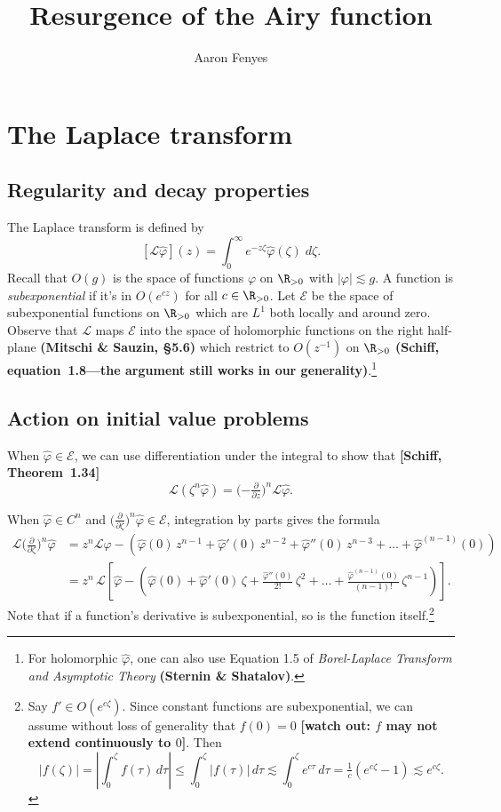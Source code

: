 \documentclass{article}
\title{Resurgence of the Airy function}
\author{Aaron Fenyes}
\theoremstyle{definition}
\theoremstyle{plain}
\newcommand{\posreal}{\R_{> 0}}
\newcommand{\laplace}{\mathcal{L}}
\begin{document}
\maketitle
\section{The Laplace transform}
\subsection{Regularity and decay properties}
The Laplace transform is defined by
\[ [\mathcal{L}\hat{\varphi}](z) = \int_0^\infty e^{-z \zeta} \hat{\varphi}(\zeta)\;d\zeta. \]
Recall that $O(g)$ is the space of functions $\varphi$ on $\posreal$ with $|\varphi| \lesssim g$. A function is {\em subexponential} if it's in $O(e^{cz})$ for all $c \in \posreal$. Let $\mathcal{E}$ be the space of subexponential functions on $\posreal$ which are $L^1$ both locally and around zero. Observe that $\laplace$ maps $\mathcal{E}$ into the space of holomorphic functions on the right half-plane \textbf{(Mitschi \& Sauzin, \S 5.6)} which restrict to $O(z^{-1})$ on $\posreal$ \textbf{(Schiff, equation~1.8---the argument still works in our generality)}.\footnote{For holomorphic $\hat{\varphi}$, one can also use Equation 1.5 of {\em Borel-Laplace Transform and Asymptotic Theory} \textbf{(Sternin \& Shatalov)}.}
\subsection{Action on initial value problems}
When $\hat{\varphi} \in \mathcal{E}$, we can use differentiation under the integral to show that \textbf{[Schiff, Theorem~1.34]}
\[ \laplace (\zeta^n \hat{\varphi}) = \big({-\tfrac{\partial}{\partial z}}\big)^n \laplace \hat{\varphi}. \]

When $\hat{\varphi} \in C^n$ and $\big(\tfrac{\partial}{\partial \zeta}\big)^n \hat{\varphi} \in \mathcal{E}$, integration by parts gives the formula
\begin{align*}
\laplace \big(\tfrac{\partial}{\partial \zeta}\big)^n \hat{\varphi} & = z^n \laplace \hat{\varphi} - \left( \hat{\varphi}(0)\,z^{n-1} + \hat{\varphi}'(0)\,z^{n-2} + \hat{\varphi}''(0)\,z^{n-3} + \ldots + \hat{\varphi}^{(n-1)}(0) \right) \\
& = z^n\,\laplace\left[ \hat{\varphi} - \left( \hat{\varphi}(0) + \hat{\varphi}'(0)\,\zeta + \tfrac{\hat{\varphi}''(0)}{2!}\,\zeta^2 + \ldots + \tfrac{\hat{\varphi}^{(n-1)}(0)}{(n-1)!}\,\zeta^{n-1} \right) \right].
\end{align*}
Note that if a function's derivative is subexponential, so is the function itself.\footnote{Say $f' \in O(e^{c\zeta})$. Since constant functions are subexponential, we can assume without loss of generality that $f(0) = 0$ \textbf{[watch out: $f$ may not extend continuously to $0$]}. Then \[ |f(\zeta)| = \left|\int_0^\zeta f(\tau)\,d\tau\right| \le \int_0^\zeta |f(\tau)|\,d\tau \lesssim \int_0^\zeta e^{c\tau}\,d\tau = \tfrac{1}{c}(e^{c\zeta} - 1) \lesssim e^{c\zeta}.\]}
\end{document}
